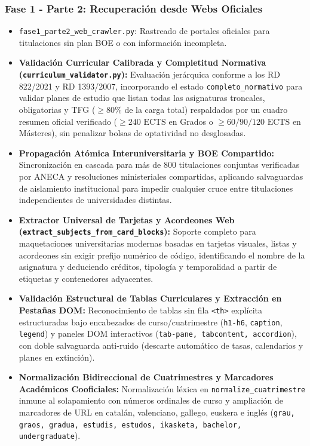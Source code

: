 \subsubsection{Fase 1 - Parte 2: Recuperación desde Webs Oficiales}
\begin{itemize}
    \item \texttt{fase1\_parte2\_web\_crawler.py}: Rastreado de portales oficiales para titulaciones sin plan BOE o con información incompleta.
    \item \textbf{Validación Curricular Calibrada y Completitud Normativa (\texttt{curriculum\_validator.py}):} Evaluación jerárquica conforme a los RD 822/2021 y RD 1393/2007, incorporando el estado \texttt{completo\_normativo} para validar planes de estudio que listan todas las asignaturas troncales, obligatorias y TFG ($\ge 80\%$ de la carga total) respaldados por un cuadro resumen oficial verificado ($\ge 240\text{ ECTS}$ en Grados o $\ge 60/90/120\text{ ECTS}$ en Másteres), sin penalizar bolsas de optatividad no desglosadas.
    \item \textbf{Propagación Atómica Interuniversitaria y BOE Compartido:} Sincronización en cascada para más de 800 titulaciones conjuntas verificadas por ANECA y resoluciones ministeriales compartidas, aplicando salvaguardas de aislamiento institucional para impedir cualquier cruce entre titulaciones independientes de universidades distintas.
    \item \textbf{Extractor Universal de Tarjetas y Acordeones Web (\texttt{extract\_subjects\_from\_card\_blocks}):} Soporte completo para maquetaciones universitarias modernas basadas en tarjetas visuales, listas y acordeones sin exigir prefijo numérico de código, identificando el nombre de la asignatura y deduciendo créditos, tipología y temporalidad a partir de etiquetas y contenedores adyacentes.
    \item \textbf{Validación Estructural de Tablas Curriculares y Extracción en Pestañas DOM:} Reconocimiento de tablas sin fila \texttt{<th>} explícita estructuradas bajo encabezados de curso/cuatrimestre (\texttt{h1-h6}, \texttt{caption}, \texttt{legend}) y paneles DOM interactivos (\texttt{tab-pane, tabcontent, accordion}), con doble salvaguarda anti-ruido (descarte automático de tasas, calendarios y planes en extinción).
    \item \textbf{Normalización Bidireccional de Cuatrimestres y Marcadores Académicos Cooficiales:} Normalización léxica en \texttt{normalize\_cuatrimestre} inmune al solapamiento con números ordinales de curso y ampliación de marcadores de URL en catalán, valenciano, gallego, euskera e inglés (\texttt{grau, graos, gradua, estudis, estudos, ikasketa, bachelor, undergraduate}).

\end{itemize}
